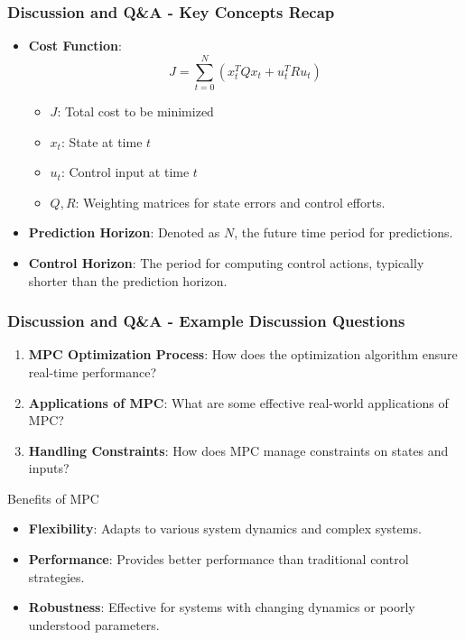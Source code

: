 \documentclass[aspectratio=169]{beamer}
\begin{document}
\begin{frame}[fragile]
    \frametitle{Discussion and Q\&A - Key Concepts Recap}
    \begin{itemize}
        \item \textbf{Cost Function}:
        \begin{equation}
            J = \sum_{t=0}^{N} (x_t^T Q x_t + u_t^T R u_t)
        \end{equation}
        \begin{itemize}
            \item \(J\): Total cost to be minimized
            \item \(x_t\): State at time \(t\)
            \item \(u_t\): Control input at time \(t\)
            \item \(Q, R\): Weighting matrices for state errors and control efforts.
        \end{itemize}

        \item \textbf{Prediction Horizon}: Denoted as \(N\), the future time period for predictions.
        
        \item \textbf{Control Horizon}: The period for computing control actions, typically shorter than the prediction horizon.
    \end{itemize}
\end{frame}

\begin{frame}[fragile]
    \frametitle{Discussion and Q\&A - Example Discussion Questions}
    \begin{enumerate}
        \item \textbf{MPC Optimization Process}: 
        How does the optimization algorithm ensure real-time performance?
        
        \item \textbf{Applications of MPC}: 
        What are some effective real-world applications of MPC?
        
        \item \textbf{Handling Constraints}: 
        How does MPC manage constraints on states and inputs?
    \end{enumerate}

    \begin{block}{Benefits of MPC}
        \begin{itemize}
            \item \textbf{Flexibility}: Adapts to various system dynamics and complex systems.
            \item \textbf{Performance}: Provides better performance than traditional control strategies.
            \item \textbf{Robustness}: Effective for systems with changing dynamics or poorly understood parameters.
        \end{itemize}
    \end{block}
\end{frame}
\end{document}
